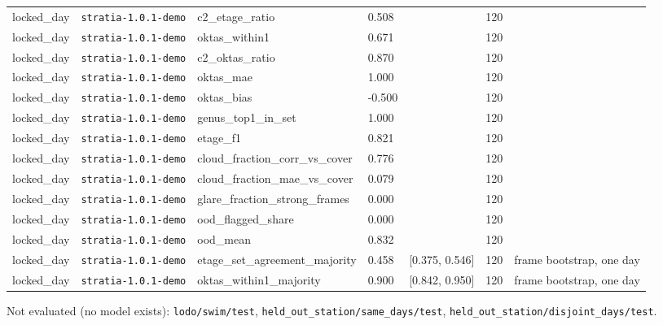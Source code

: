 \begin{center}
{\begin{tabular}{lllllll}
locked\_day & \texttt{stratia-1.0.1-demo} & c2\_etage\_ratio & 0.508 &  & 120 &  \\
locked\_day & \texttt{stratia-1.0.1-demo} & oktas\_within1 & 0.671 &  & 120 &  \\
locked\_day & \texttt{stratia-1.0.1-demo} & c2\_oktas\_ratio & 0.870 &  & 120 &  \\
locked\_day & \texttt{stratia-1.0.1-demo} & oktas\_mae & 1.000 &  & 120 &  \\
locked\_day & \texttt{stratia-1.0.1-demo} & oktas\_bias & -0.500 &  & 120 &  \\
locked\_day & \texttt{stratia-1.0.1-demo} & genus\_top1\_in\_set & 1.000 &  & 120 &  \\
locked\_day & \texttt{stratia-1.0.1-demo} & etage\_f1 & 0.821 &  & 120 &  \\
locked\_day & \texttt{stratia-1.0.1-demo} & cloud\_fraction\_corr\_vs\_cover & 0.776 &  & 120 &  \\
locked\_day & \texttt{stratia-1.0.1-demo} & cloud\_fraction\_mae\_vs\_cover & 0.079 &  & 120 &  \\
locked\_day & \texttt{stratia-1.0.1-demo} & glare\_fraction\_strong\_frames & 0.000 &  & 120 &  \\
locked\_day & \texttt{stratia-1.0.1-demo} & ood\_flagged\_share & 0.000 &  & 120 &  \\
locked\_day & \texttt{stratia-1.0.1-demo} & ood\_mean & 0.832 &  & 120 &  \\
locked\_day & \texttt{stratia-1.0.1-demo} & etage\_set\_agreement\_majority & 0.458 & [0.375, 0.546] & 120 & frame bootstrap, one day \\
locked\_day & \texttt{stratia-1.0.1-demo} & oktas\_within1\_majority & 0.900 & [0.842, 0.950] & 120 & frame bootstrap, one day \\
\bottomrule
\end{tabular}}
\end{center}

Not evaluated (no model exists): \texttt{lodo/swim/test}, \texttt{held\_\allowbreak{}out\_\allowbreak{}station/same\_\allowbreak{}days/test}, \texttt{held\_\allowbreak{}out\_\allowbreak{}station/disjoint\_\allowbreak{}days/test}.

